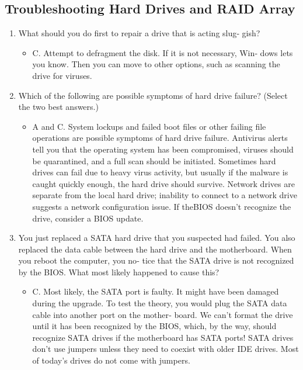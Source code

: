 \documentclass{article}
\begin{document}
\subsection{Troubleshooting Hard Drives and RAID Array} 
\begin{enumerate}
    \item What should you do first to repair a drive that is acting slug‐
gish?
    \begin{itemize}
        \item C. Attempt to defragment the disk. If it is not necessary, Win‐
dows lets you know. Then you can move to other options, such
as scanning the drive for viruses.
    \end{itemize}
    \item Which of the following are possible symptoms of hard drive
failure? (Select the two best answers.)
    \begin{itemize}
        \item A and C. System lockups and failed boot files or other failing
file operations are possible symptoms of hard drive failure.
Antivirus alerts tell you that the operating system has been
compromised, viruses should be quarantined, and a full scan
should be initiated. Sometimes hard drives can fail due to
heavy virus activity, but usually if the malware is caught
quickly enough, the hard drive should survive. Network drives
are separate from the local hard drive; inability to connect to a
network drive suggests a network configuration issue. If theBIOS doesn’t recognize the drive, consider a BIOS update.
    \end{itemize}
    \item You just replaced a SATA hard drive that you suspected had
failed. You also replaced the data cable between the hard drive and the motherboard. When you reboot the computer, you no‐
tice that the SATA drive is not recognized by the BIOS. What
most likely happened to cause this?
    \begin{itemize}
        \item C. Most likely, the SATA port is faulty. It might have been
damaged during the upgrade. To test the theory, you would
plug the SATA data cable into another port on the mother‐
board. We can’t format the drive until it has been recognized
by the BIOS, which, by the way, should recognize SATA
drives if the motherboard has SATA ports! SATA drives don’t
use jumpers unless they need to coexist with older IDE drives.
Most of today’s drives do not come with jumpers.
    \end{itemize}

\end{enumerate}
\end{document}
